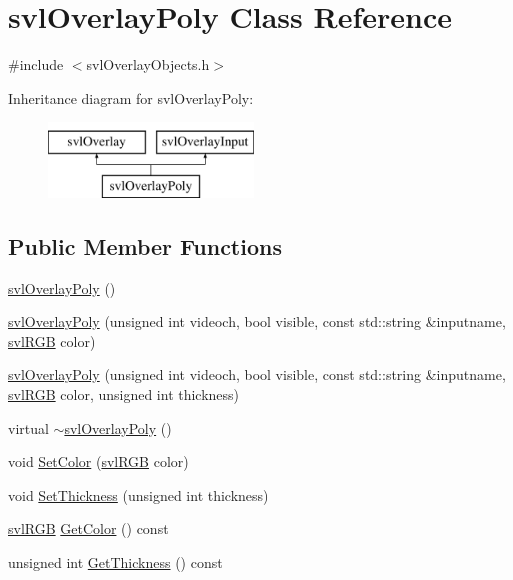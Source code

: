 \hypertarget{classsvl_overlay_poly}{\section{svl\-Overlay\-Poly Class Reference}
\label{classsvl_overlay_poly}
}


{\ttfamily \#include $<$svl\-Overlay\-Objects.\-h$>$}

Inheritance diagram for svl\-Overlay\-Poly\-:\begin{figure}[H]
\begin{center}
\leavevmode
\includegraphics[height=2.000000cm]{db/d55/classsvl_overlay_poly}
\end{center}
\end{figure}
\subsection*{Public Member Functions}
\begin{DoxyCompactItemize}
\item 
\hyperlink{classsvl_overlay_poly_ab4b107e442172973c6fdc1f7c36fca57}{svl\-Overlay\-Poly} ()
\item 
\hyperlink{classsvl_overlay_poly_abf76edb915d18bae12dde0d6ff47561d}{svl\-Overlay\-Poly} (unsigned int videoch, bool visible, const std\-::string \&inputname, \hyperlink{structsvl_r_g_b}{svl\-R\-G\-B} color)
\item 
\hyperlink{classsvl_overlay_poly_ab4fbd3c2a843e2533a2d98dd45116dc7}{svl\-Overlay\-Poly} (unsigned int videoch, bool visible, const std\-::string \&inputname, \hyperlink{structsvl_r_g_b}{svl\-R\-G\-B} color, unsigned int thickness)
\item 
virtual \hyperlink{classsvl_overlay_poly_a1304caed814d4d26e4a8aa4acc8d47c3}{$\sim$svl\-Overlay\-Poly} ()
\item 
void \hyperlink{classsvl_overlay_poly_a0f277c2e37e0aabe403f687a02fce508}{Set\-Color} (\hyperlink{structsvl_r_g_b}{svl\-R\-G\-B} color)
\item 
void \hyperlink{classsvl_overlay_poly_a7082b7800f95a2226a338c99d43907f1}{Set\-Thickness} (unsigned int thickness)
\item 
\hyperlink{structsvl_r_g_b}{svl\-R\-G\-B} \hyperlink{classsvl_overlay_poly_ad8ddec61a3a6ff847cbc5b21f03b03da}{Get\-Color} () const 
\item 
unsigned int \hyperlink{classsvl_overlay_poly_a920f067bb1fba37c08d850b71bd2006c}{Get\-Thickness} () const 
\end{DoxyCompactItemize}
